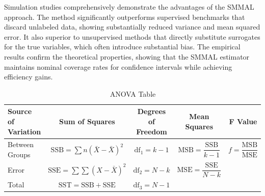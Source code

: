 \documentclass[11pt]{article}
\begin{document}
Simulation studies comprehensively demonstrate the advantages of the SMMAL approach. The method significantly outperforms supervised benchmarks that discard unlabeled data, showing substantially reduced variance and mean squared error. It also superior to unsupervised methods that directly substitute surrogates for the true variables, which often introduce substantial bias. The empirical results confirm the theoretical properties, showing that the SMMAL estimator maintains nominal coverage rates for confidence intervals while achieving efficiency gains.

\begin{table}[h]
	\centering
	\begin{tabular}{lcccc}
		\toprule
		\textbf{Source of Variation} & \textbf{Sum of Squares} & \textbf{Degrees of Freedom} & \textbf{Mean Squares} & \textbf{F Value} \\
		\midrule
		Between Groups & $\text{SSB} = \sum n(\bar{X} - \bar{X})^2$ & $\text{df}_1 = k - 1$ & $\text{MSB} = \dfrac{\text{SSB}}{k - 1}$ & $f = \dfrac{\text{MSB}}{\text{MSE}}$ \\
		Error & $\text{SSE} = \sum\sum(X - \bar{X})^2$ & $\text{df}_2 = N - k$ & $\text{MSE} = \dfrac{\text{SSE}}{N - k}$ & \\
		Total & $\text{SST} = \text{SSB} + \text{SSE}$ & $\text{df}_3 = N - 1$ & & \\
		\bottomrule
	\end{tabular}
	\caption{ANOVA Table}
	\label{tab:anova}
\end{table}
\end{document}
